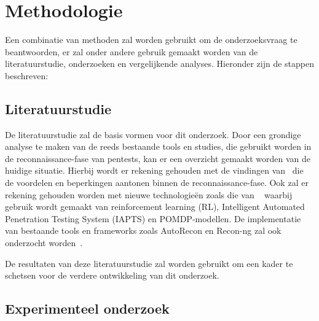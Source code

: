 


\section{Methodologie}
\label{sec:methodologie}

Een combinatie van methoden zal worden gebruikt om de onderzoeksvraag te beantwoorden, er zal onder andere gebruik
gemaakt worden van de literatuurstudie, onderzoeken en vergelijkende analyses. Hieronder zijn de stappen beschreven:

\subsection{Literatuurstudie}

De literatuurstudie zal de basis vormen voor dit onderzoek. Door een grondige analyse te maken van de reeds bestaande tools en studies,
die gebruikt worden in de reconnaissance-fase van pentests, kan er een overzicht gemaakt worden van de huidige situatie.
Hierbij wordt er rekening gehouden met de vindingen van~\textcite{Shah,Kothia} die de voordelen en beperkingen aantonen binnen de reconnaissance-fase.
Ook zal er rekening gehouden worden met nieuwe technologieën zoals die van ~\textcite{Ghanem,Hoang} waarbij gebruik wordt gemaakt van
reinforcement learning (RL), Intelligent Automated Penetration Testing System (IAPTS) en POMDP-modellen. De implementatie van bestaande
tools en frameworks zoals AutoRecon en Recon-ng zal ook onderzocht worden~\autocite{Shebli}.

De resultaten van deze literatuurstudie zal worden gebruikt om een kader te schetsen voor de verdere ontwikkeling van dit onderzoek.

\subsection{Experimenteel onderzoek}

